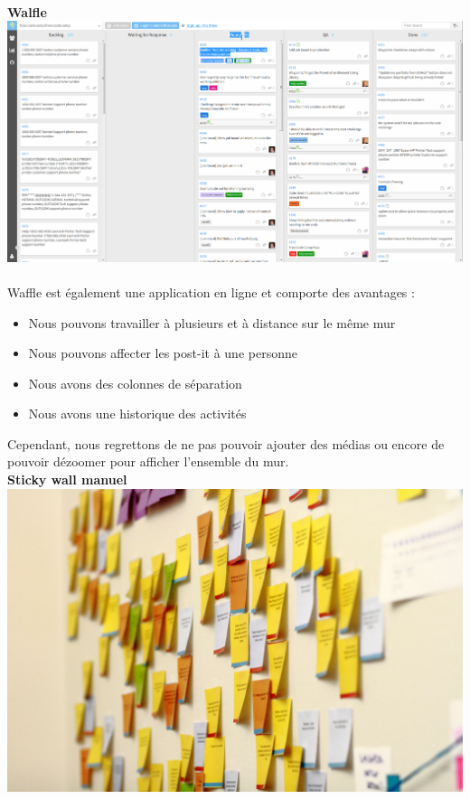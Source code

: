 \documentclass{article}
\begin{document}
\vspace{0.2cm}\\
\textbf{Walfle}
\vspace{0.2cm}\\
\includegraphics[width=\textwidth]{4}\\
\vspace{0.2cm}\\
Waffle est également une application en ligne et comporte des avantages :
\begin{itemize}
  \item Nous pouvons travailler à plusieurs et à distance sur le même mur
  \item Nous pouvons affecter les post-it à une personne
  \item Nous avons des colonnes de séparation
  \item Nous avons une historique des activités
\end{itemize}
\vspace{0.2cm}
\hspace*{0.6cm}Cependant, nous regrettons de ne pas pouvoir ajouter des médias ou encore de pouvoir dézoomer pour afficher l'ensemble du mur.
\vspace{0.2cm}\\
\textbf{Sticky wall manuel}
\vspace{0.2cm}\\
\includegraphics[width=\textwidth]{1}\\
\end{document}
